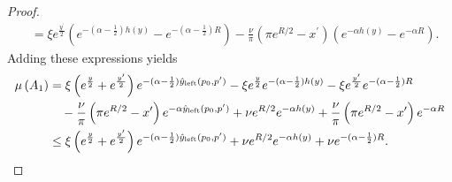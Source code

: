 \begin{proof}
\begin{align*}
	&= \xi e^{\frac{y^\prime}{2}}\left(e^{-(\alpha - \frac{1}{2})h(y)} - e^{-(\alpha - \frac{1}{2})R}\right)
		- \frac{\nu}{\pi}\left(\pi e^{R/2} - x^\prime\right)
		\left(e^{-\alpha h(y)}- e^{-\alpha R}\right).
\end{align*}
Adding these expressions yields
\begin{align*}
	\mu\left(A_1\right) &= \xi \left(e^{\frac{y}{2}} + e^{\frac{y^\prime}{2}}\right)
		e^{-(\alpha - \frac{1}{2})\hat{y}_{\text{left}}(p_0,p^\prime)}
		- \xi e^{\frac{y}{2}} e^{-(\alpha - \frac{1}{2})h(y)}
		- \xi e^{\frac{y^\prime}{2}} e^{-(\alpha-\frac{1}{2})R} \\
	&\hspace{10pt}- \frac{\nu}{\pi} \left(\pi e^{R/2} - x^\prime\right)
		e^{-\alpha\hat{y}_{\text{left}}(p_0,p^\prime)}
		+ \nu e^{R/2}e^{-\alpha h(y)} + \frac{\nu}{\pi}\left(\pi e^{R/2} - x^\prime\right) e^{-\alpha R}\\
	&\le \xi \left(e^{\frac{y}{2}} + e^{\frac{y^\prime}{2}}\right)
		e^{-(\alpha - \frac{1}{2})\hat{y}_{\text{left}}(p_0,p^\prime)}
		+ \nu e^{R/2}e^{-\alpha h(y)} + \nu e^{-(\alpha - \frac{1}{2}) R}.
\end{align*}


\end{proof}
